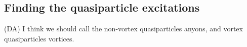 \documentclass[12pt,a4paper]{article}
\newcounter{arrow}
\newcommand{\ra}{\rightarrow}
\newcommand{\mcz}{\mathcal{Z}}
\newcommand{\mcc}{\mathcal{C}}
\newcommand{\tube}{\textbf{Tube}}
\newcommand{\dave}[1]{{\color{ao(english)}\footnotesize{(DA) #1}}}
\newcommand{\ethan}[1]{{\color{amethyst}\footnotesize{(EL) #1}}}
\newcommand{\kw}[1]{{\color{kwcolor}\footnotesize{(KW) #1}}}
\begin{document}

\subsection{Finding the quasiparticle excitations}
\dave{I think we should call the non-vortex quasiparticles anyons, and vortex quasiparticles vortices. }
\end{document}

